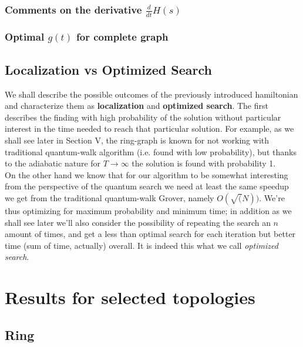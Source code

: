 \documentclass[aps,pra,reprint, onecolumn]{revtex4-2}
\begin{document}
\subsubsection{Comments on the derivative $\frac{d}{dt}H(s)$}
\subsubsection{Optimal $g(t)$ for complete graph}

\subsection{Localization vs Optimized Search}
We shall describe the possible outcomes of the previously introduced hamiltonian and characterize them as \textbf{localization} and \textbf{optimized search}. The first describes the finding with high probability of the solution without particular interest in the time needed to reach that particular solution. For example, as we shall see later in Section V, the ring-graph is known for not working with traditional quantum-walk algorithm (i.e. found with low probability), but thanks to the adiabatic nature for $T \to \infty$ the solution is found with probability 1. \\

On the other hand we know that for our algorithm to be somewhat interesting from the perspective of the quantum search we need at least the same speedup we get from the traditional quantum-walk Grover, namely $O(\sqrt(N))$. We're thus optimizing for maximum probability and minimum time; in addition as we shall see later we'll also consider the possibility of repeating the search an $n$ amount of times, and get a less than optimal search for each iteration but better time (sum of time, actually) overall. It is indeed this what we call \textit{optimized search}.


\section{Results for selected topologies}

\subsection{Ring}
\end{document}
